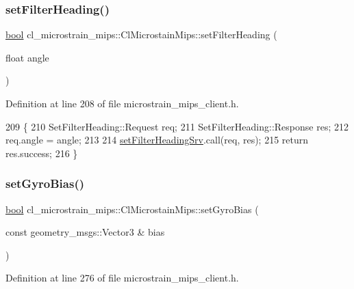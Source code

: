 \subsubsection{\texorpdfstring{set\+Filter\+Heading()}{setFilterHeading()}}
{\footnotesize\ttfamily \hyperlink{classbool}{bool} cl\+\_\+microstrain\+\_\+mips\+::\+Cl\+Microstain\+Mips\+::set\+Filter\+Heading (\begin{DoxyParamCaption}\item[{float}]{angle }\end{DoxyParamCaption})\hspace{0.3cm}{\ttfamily [inline]}}



Definition at line 208 of file microstrain\+\_\+mips\+\_\+client.\+h.


\begin{DoxyCode}
209     \{
210         SetFilterHeading::Request req;
211         SetFilterHeading::Response res;
212         req.angle = angle;
213 
214         \hyperlink{classcl__microstrain__mips_1_1ClMicrostainMips_abe64faba505dfdab0b78b7cf31f9609d}{setFilterHeadingSrv}.call(req, res);
215         \textcolor{keywordflow}{return} res.success;
216     \}
\end{DoxyCode}
\mbox{\label{classcl__microstrain__mips_1_1ClMicrostainMips_aabb65ca3b2e8be4a1ad2284d543ddd9c}} 
\subsubsection{\texorpdfstring{set\+Gyro\+Bias()}{setGyroBias()}}
{\footnotesize\ttfamily \hyperlink{classbool}{bool} cl\+\_\+microstrain\+\_\+mips\+::\+Cl\+Microstain\+Mips\+::set\+Gyro\+Bias (\begin{DoxyParamCaption}\item[{const geometry\+\_\+msgs\+::\+Vector3 \&}]{bias }\end{DoxyParamCaption})\hspace{0.3cm}{\ttfamily [inline]}}



Definition at line 276 of file microstrain\+\_\+mips\+\_\+client.\+h.


